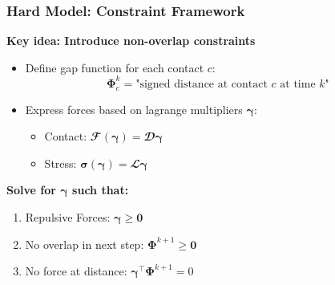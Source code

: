 \documentclass[10pt,t]{beamer}
\begin{document}
\begin{frame}
    \frametitle{Hard Model: Constraint Framework}

    \textbf{Key idea: Introduce non-overlap constraints}
    \begin{itemize}
        \item Define gap function for each contact $c$:
              \begin{equation*}
                  \boldsymbol{\Phi}^k_c = \text{"signed distance at contact } c \text{ at time } k  \text{"}
              \end{equation*}

        \item Express forces based on lagrange multipliers $\boldsymbol{\gamma}$:
              \begin{itemize}
                  \item Contact: $\mathbfcal{F}(\boldsymbol{\gamma}) = \mathbfcal{D} \boldsymbol{\gamma}$
                  \item Stress: $\boldsymbol{\sigma}(\boldsymbol{\gamma}) = \mathbfcal{L} \boldsymbol{\gamma}$
              \end{itemize}
    \end{itemize}

    \vspace{0.3cm}

    \textbf{Solve for $\boldsymbol{\gamma}$ such that:}
    \begin{enumerate}
        \item {Repulsive Forces:} \hspace{2.42cm}  $\boldsymbol{\gamma} \geq \mathbf{0}$
        \item {No overlap in next step:} \hspace{1cm} $\boldsymbol{\Phi}^{k+1} \geq \mathbf{0}$
        \item {No force at distance:} \hspace{1cm} $\boldsymbol{\gamma}^\top \boldsymbol{\Phi}^{k+1} = 0$
    \end{enumerate}

\end{frame}
\end{document}
